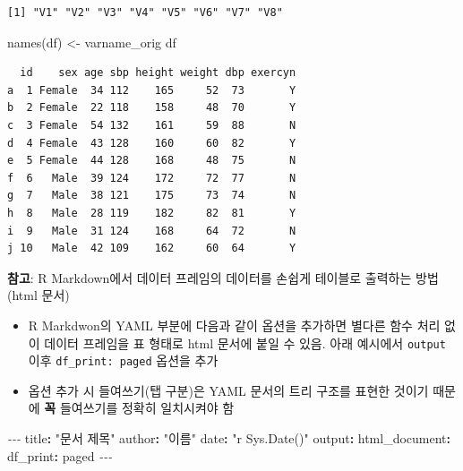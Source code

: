 \documentclass[
  11pt,
]{krantz}
\makeatletter
\newenvironment{Shaded}{\begin{snugshade}}{\end{snugshade}}
\newcommand{\AttributeTok}[1]{\textcolor[rgb]{0.61,0.61,0.61}{#1}}
\newcommand{\FunctionTok}[1]{\textcolor[rgb]{0,0,0}{#1}}
\newcommand{\KeywordTok}[1]{\textcolor[rgb]{0.27,0.27,0.27}{\textbf{#1}}}
\newcommand{\NormalTok}[1]{#1}
\newcommand{\OtherTok}[1]{\textcolor[rgb]{0.37,0.37,0.37}{#1}}
\newcommand{\PreprocessorTok}[1]{\textcolor[rgb]{0.37,0.37,0.37}{\textit{#1}}}
\newcommand{\StringTok}[1]{\textcolor[rgb]{0.5,0.5,0.5}{#1}}
\providecommand{\tightlist}{%
  \setlength{\itemsep}{0pt}\setlength{\parskip}{0pt}}
\newenvironment{kframe}{%
\medskip{}
\setlength{\fboxsep}{.8em}
 \def\at@end@of@kframe{}%
 \ifinner\ifhmode%
  \def\at@end@of@kframe{\end{minipage}}%
  \begin{minipage}{\columnwidth}%
 \fi\fi%
 \def\FrameCommand##1{\hskip\@totalleftmargin \hskip-\fboxsep
 \colorbox{shadecolor}{##1}\hskip-\fboxsep
     \hskip-\linewidth \hskip-\@totalleftmargin \hskip\columnwidth}%
 \MakeFramed {\advance\hsize-\width
   \@totalleftmargin\z@ \linewidth\hsize
   \@setminipage}}%
 {\par\unskip\endMakeFramed%
 \at@end@of@kframe}
\newenvironment{rmdblock}[1]
  {
  \begin{itemize}
  \renewcommand{\labelitemi}{
    \raisebox{-.7\height}[0pt][0pt]{
      {\setkeys{Gin}{width=3em,keepaspectratio}\texttt{[image: images/\#1]}}
    }
  }
  \setlength{\fboxsep}{1em}
  \begin{kframe}
  \item
  }
  {
  \end{kframe}
  \end{itemize}
  }
\newenvironment{rmdtip}
  {\begin{rmdblock}{tip}}
  {\end{rmdblock}}
\makeatother
\begin{document}
\begin{verbatim}
[1] "V1" "V2" "V3" "V4" "V5" "V6" "V7" "V8"
\end{verbatim}

\begin{Shaded}
\begin{Highlighting}[]
\FunctionTok{names}\NormalTok{(df) }\OtherTok{\textless{}{-}}\NormalTok{ varname\_orig}
\NormalTok{df}
\end{Highlighting}
\end{Shaded}

\begin{verbatim}
  id    sex age sbp height weight dbp exercyn
a  1 Female  34 112    165     52  73       Y
b  2 Female  22 118    158     48  70       Y
c  3 Female  54 132    161     59  88       N
d  4 Female  43 128    160     60  82       Y
e  5 Female  44 128    168     48  75       N
f  6   Male  39 124    172     72  77       N
g  7   Male  38 121    175     73  74       N
h  8   Male  28 119    182     82  81       Y
i  9   Male  31 124    168     64  72       N
j 10   Male  42 109    162     60  64       Y
\end{verbatim}

\normalsize

\footnotesize

\begin{rmdtip}
\textbf{참고}: R Markdown에서 데이터 프레임의 데이터를 손쉽게 테이블로 출력하는 방법(html 문서)

\begin{itemize}
\tightlist
\item
  R Markdwon의 YAML 부분에 다음과 같이 옵션을 추가하면 별다른 함수 처리 없이 데이터 프레임을 표 형태로 html 문서에 붙일 수 있음.
  아래 예시에서 \texttt{output} 이후 \texttt{df\_print:\ paged} 옵션을 추가
\item
  옵션 추가 시 들여쓰기(탭 구분)은 YAML 문서의 트리 구조를 표현한 것이기 때문에 \textbf{꼭} 들여쓰기를 정확히 일치시켜야 함
\end{itemize}
\end{rmdtip}

\normalsize

\footnotesize

\begin{Shaded}
\begin{Highlighting}[]
\PreprocessorTok{{-}{-}{-}}
\FunctionTok{title}\KeywordTok{:}\AttributeTok{ }\StringTok{"문서 제목"}
\FunctionTok{author}\KeywordTok{:}\AttributeTok{ }\StringTok{"이름"}
\FunctionTok{date}\KeywordTok{:}\AttributeTok{ }\StringTok{"\textasciigrave{}r Sys.Date()\textasciigrave{}"}
\FunctionTok{output}\KeywordTok{:}\AttributeTok{ }
\AttributeTok{  }\FunctionTok{html\_document}\KeywordTok{:}\AttributeTok{ }
\AttributeTok{    }\FunctionTok{df\_print}\KeywordTok{:}\AttributeTok{ paged}
\PreprocessorTok{{-}{-}{-}}
\end{Highlighting}
\end{Shaded}
\end{document}
